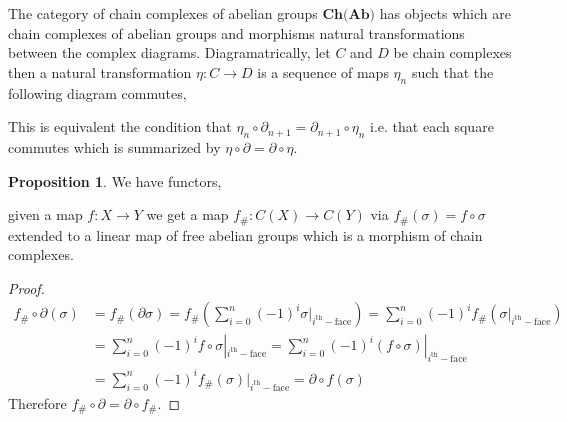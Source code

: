 \documentclass[12pt]{extarticle}
\newcommand{\Top}{\mathbf{Top}}
\theoremstyle{definition}
\newtheorem{proposition}[theorem]{Proposition}
\newenvironment{definition}[1][Definition:]{\begin{trivlist}
\item[\hskip \labelsep {\bfseries #1}]}{\end{trivlist}}
\begin{document}
\begin{definition}
The category of chain complexes of abelian groups $\textbf{Ch(Ab)}$ has objects which are chain complexes of abelian groups and morphisms natural transformations between the complex diagrams. Diagramatrically, let $C$ and $D$ be chain complexes then a natural transformation $\eta : C \to D$ is a sequence of maps $\eta_n$ such that the following diagram commutes,

\begin{center}
\end{center}
This is equivalent the condition that $\eta_{n} \circ \partial_{n + 1} = \partial_{n + 1} \circ \eta_n$ i.e. that each square commutes which is summarized by $\eta \circ \partial = \partial \circ \eta$. 
 
\end{definition}

\begin{proposition}
We have functors,
\begin{center}
\end{center}
given a map $f : X \to Y$ we get a map $f_\# : C(X) \to C(Y)$ via $f_\#(\sigma) = f \circ \sigma $ extended to a linear map of free abelian groups which is a morphism of chain complexes.
\end{proposition}

\begin{proof}
\begin{align*}
f_\# \circ \partial(\sigma) & = f_\#(\partial \sigma) = f_\# \left( \sum_{i = 0}^n (-1)^i \sigma|_{i^{\mathrm{th}}-\text{face}} \right) =  \sum_{i = 0}^n (-1)^i f_\#(\sigma|_{i^{\mathrm{th}}-\text{face}}) 
\\
& = \sum_{i = 0}^n (-1)^i f \circ \sigma|_{i^{\mathrm{th}}-\text{face}} = \sum_{i = 0}^n (-1)^i (f \circ \sigma)|_{i^{\mathrm{th}}-\text{face}} 
\\
& = \sum_{i = 0}^n (-1)^i f_\#(\sigma)|_{i^{\mathrm{th}}-\text{face}} = \partial \circ f (\sigma) 
\end{align*}
Therefore $f_\# \circ \partial = \partial \circ f_\#$. 
\end{proof}
\end{document}
